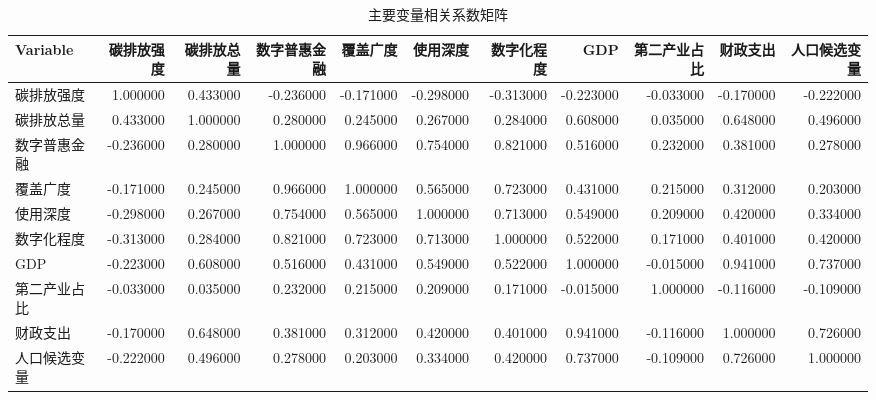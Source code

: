 \begin{table}
\caption{主要变量相关系数矩阵}
\label{tab:variable_correlation_matrix}
\begin{tabular}{lrrrrrrrrrr}
\toprule
Variable & 碳排放强度 & 碳排放总量 & 数字普惠金融 & 覆盖广度 & 使用深度 & 数字化程度 & GDP & 第二产业占比 & 财政支出 & 人口候选变量 \\
\midrule
碳排放强度 & 1.000000 & 0.433000 & -0.236000 & -0.171000 & -0.298000 & -0.313000 & -0.223000 & -0.033000 & -0.170000 & -0.222000 \\
碳排放总量 & 0.433000 & 1.000000 & 0.280000 & 0.245000 & 0.267000 & 0.284000 & 0.608000 & 0.035000 & 0.648000 & 0.496000 \\
数字普惠金融 & -0.236000 & 0.280000 & 1.000000 & 0.966000 & 0.754000 & 0.821000 & 0.516000 & 0.232000 & 0.381000 & 0.278000 \\
覆盖广度 & -0.171000 & 0.245000 & 0.966000 & 1.000000 & 0.565000 & 0.723000 & 0.431000 & 0.215000 & 0.312000 & 0.203000 \\
使用深度 & -0.298000 & 0.267000 & 0.754000 & 0.565000 & 1.000000 & 0.713000 & 0.549000 & 0.209000 & 0.420000 & 0.334000 \\
数字化程度 & -0.313000 & 0.284000 & 0.821000 & 0.723000 & 0.713000 & 1.000000 & 0.522000 & 0.171000 & 0.401000 & 0.420000 \\
GDP & -0.223000 & 0.608000 & 0.516000 & 0.431000 & 0.549000 & 0.522000 & 1.000000 & -0.015000 & 0.941000 & 0.737000 \\
第二产业占比 & -0.033000 & 0.035000 & 0.232000 & 0.215000 & 0.209000 & 0.171000 & -0.015000 & 1.000000 & -0.116000 & -0.109000 \\
财政支出 & -0.170000 & 0.648000 & 0.381000 & 0.312000 & 0.420000 & 0.401000 & 0.941000 & -0.116000 & 1.000000 & 0.726000 \\
人口候选变量 & -0.222000 & 0.496000 & 0.278000 & 0.203000 & 0.334000 & 0.420000 & 0.737000 & -0.109000 & 0.726000 & 1.000000 \\
\bottomrule
\end{tabular}
\end{table}
